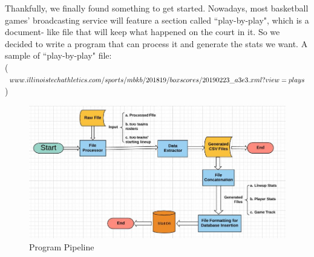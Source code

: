 \documentclass[conference]{IEEEtran}
\begin{document}
Thankfully, we finally found something to get started. Nowadays, most basketball games' broadcasting service will feature a section called ``play-by-play", which is a document- like file that will keep what happened on the court in it. So we decided to write a program that can process it and generate the stats we want. A sample of ``play-by-play" file: \\
($www.illinoistechathletics.com/sports/mbkb/2018\-19/boxscores/20190223\_a3e3.xml?view=plays$)

\begin{figure}[h!]
  \includegraphics[width=\linewidth]{flowchart.jpg}
  \caption{Program Pipeline}
  \vspace{-1mm}
  \label{fig:flowchart}
\end{figure}
\end{document}
